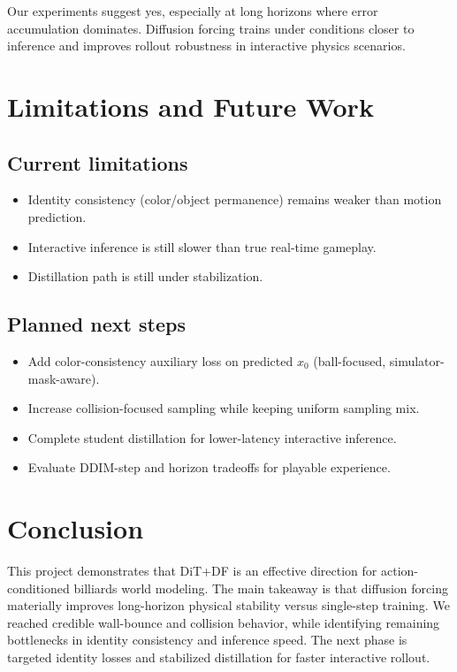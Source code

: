 \documentclass[11pt]{article}
\begin{document}
Our experiments suggest yes, especially at long horizons where error accumulation dominates. Diffusion forcing trains under conditions closer to inference and improves rollout robustness in interactive physics scenarios.

\section{Limitations and Future Work}
\subsection{Current limitations}
\begin{itemize}[leftmargin=*]
  \item Identity consistency (color/object permanence) remains weaker than motion prediction.
  \item Interactive inference is still slower than true real-time gameplay.
  \item Distillation path is still under stabilization.
\end{itemize}

\subsection{Planned next steps}
\begin{itemize}[leftmargin=*]
  \item Add color-consistency auxiliary loss on predicted $x_0$ (ball-focused, simulator-mask-aware).
  \item Increase collision-focused sampling while keeping uniform sampling mix.
  \item Complete student distillation for lower-latency interactive inference.
  \item Evaluate DDIM-step and horizon tradeoffs for playable experience.
\end{itemize}

\section{Conclusion}
This project demonstrates that DiT+DF is an effective direction for action-conditioned billiards world modeling. The main takeaway is that diffusion forcing materially improves long-horizon physical stability versus single-step training. We reached credible wall-bounce and collision behavior, while identifying remaining bottlenecks in identity consistency and inference speed. The next phase is targeted identity losses and stabilized distillation for faster interactive rollout.



\end{document}
